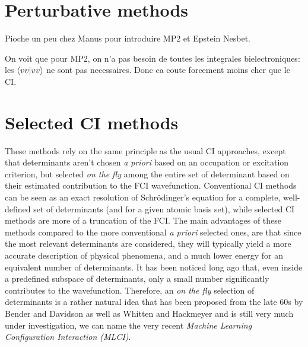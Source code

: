 \documentclass[./thesis.tex]{subfiles}
\begin{document}
\section{Perturbative methods}


\alert{Pioche un peu chez Manus pour introduire MP2 et Epstein Nesbet.}



\alert{On voit que pour MP2, on n'a pas besoin de toutes les integrales
bielectroniques: les $\braket{vv}{vv}$ ne sont pas necessaires. Donc ca coute
forcement moins cher que le CI.}

\section{Selected CI methods}

These methods rely on the same principle as the usual CI approaches, except that determinants aren't chosen \textit{a priori} based on an occupation or excitation criterion, but selected \emph{on the fly} among the entire set of determinant based on their estimated contribution to the FCI wavefunction. Conventional CI methods can be seen as an exact resolution of Schrödinger's equation for a complete, well-defined set of determinants (and for a given atomic basis set), while selected CI methods are more of a truncation of the FCI.
The main advantages of these methods compared to the more conventional \textit{a priori} selected ones, are that since the most relevant determinants are considered, they will typically yield a more accurate description of physical phenomena, and a much lower energy for an equivalent number of determinants.
It has been noticed long ago that, even inside a predefined subspace of determinants, only a small number significantly contributes to the wavefunction. Therefore, an \emph{on the fly} selection of determinants is a rather natural idea that has been proposed from the late 60s by Bender and Davidson\cite{Bender_1969} as well as Whitten and Hackmeyer\cite{Whitten_1969} and is still very much under investigation, we can name the very recent \emph{Machine Learning Configuration Interaction (MLCI)}\cite{1808.05787}.
\end{document}
